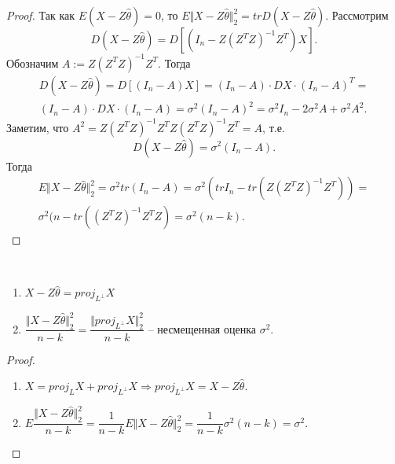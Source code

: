 \begin{proof}
    Так как $\displaystyle E( X-Z\hat{\theta }) =0$, то $\displaystyle E\Vert X-Z\hat{\theta }\Vert _{2}^{2} =trD( X-Z\hat{\theta })$. Рассмотрим
    \begin{equation*}
        D( X-Z\hat{\theta }) =D\left[\left( I_{n} -Z\left( Z^{T} Z\right)^{-1} Z^{T}\right) X\right] .
    \end{equation*}
    Обозначим $\displaystyle A:=Z\left( Z^{T} Z\right)^{-1} Z^{T}$. Тогда
    \begin{gather*}
        D( X-Z\hat{\theta }) =D[( I_{n} -A) X] =( I_{n} -A) \cdotp DX\cdotp ( I_{n} -A)^{T} =\\
        ( I_{n} -A) \cdotp DX\cdotp ( I_{n} -A) =\sigma ^{2}( I_{n} -A)^{2} =\sigma ^{2} I_{n} -2\sigma ^{2} A+\sigma ^{2} A^{2} .
    \end{gather*}
    Заметим, что $\displaystyle A^{2} =Z\left( Z^{T} Z\right)^{-1} Z^{T} Z\left( Z^{T} Z\right)^{-1} Z^{T} =A$, т.е.
    \begin{equation*}
        D( X-Z\hat{\theta }) =\sigma ^{2}( I_{n} -A) .
    \end{equation*}
    Тогда
    \begin{gather*}
        E\Vert X-Z\hat{\theta }\Vert _{2}^{2} =\sigma ^{2} tr( I_{n} -A) =\sigma ^{2}\left( trI_{n} -tr\left( Z\left( Z^{T} Z\right)^{-1} Z^{T}\right)\right) =\\
        \sigma ^{2}( n-tr\left(\left( Z^{T} Z\right)^{-1} Z^{T} Z\right) =\sigma ^{2}( n-k) .
    \end{gather*}
\end{proof}
\begin{corollary} ~
    \begin{enumerate}
        \item $\displaystyle X-Z\hat{\theta } =proj_{L^{\perp }} X$
        \item $\displaystyle \dfrac{\Vert X-Z\hat{\theta }\Vert _{2}^{2}}{n-k} =\dfrac{\Vert proj_{L^{\perp }} X\Vert _{2}^{2}}{n-k}$ -- несмещенная оценка $\displaystyle \sigma ^{2}$.
    \end{enumerate}
\end{corollary}
\begin{proof} ~
    \begin{enumerate}
        \item $\displaystyle X=proj_{L} X+proj_{L^{\perp }} X\Rightarrow proj_{L^{\perp }} X=X-Z\hat{\theta }$.
        \item $\displaystyle E\dfrac{\Vert X-Z\hat{\theta }\Vert _{2}^{2}}{n-k} =\dfrac{1}{n-k} E\Vert X-Z\hat{\theta }\Vert _{2}^{2} =\dfrac{1}{n-k} \sigma ^{2}( n-k) =\sigma ^{2}$.
    \end{enumerate}
\end{proof}
